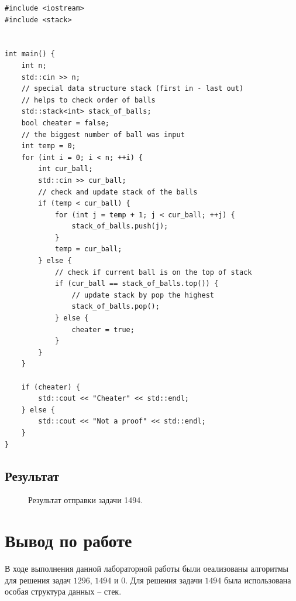 \documentclass[a5paper, 10pt]{article}
\theoremstyle{definition}
\theoremstyle{plain}
\theoremstyle{remark}
\begin{document}
\begin{center}
\begin{lstlisting}[label=some-code,caption={Исходный код для 1494}]
#include <iostream>
#include <stack>


int main() {
    int n;
    std::cin >> n;
    // special data structure stack (first in - last out)
    // helps to check order of balls
    std::stack<int> stack_of_balls;
    bool cheater = false;
    // the biggest number of ball was input
    int temp = 0;
    for (int i = 0; i < n; ++i) {
        int cur_ball;
        std::cin >> cur_ball;
        // check and update stack of the balls
        if (temp < cur_ball) {
            for (int j = temp + 1; j < cur_ball; ++j) {
                stack_of_balls.push(j);
            }
            temp = cur_ball;
        } else {
            // check if current ball is on the top of stack
            if (cur_ball == stack_of_balls.top()) {
                // update stack by pop the highest
                stack_of_balls.pop();
            } else {
                cheater = true;
            }
        }
    }

    if (cheater) {
        std::cout << "Cheater" << std::endl;
    } else {
        std::cout << "Not a proof" << std::endl;
    }
}
\end{lstlisting}
\end{center}

\subsection{Результат}
\begin{figure}[h]
\caption{Результат отправки задачи 1494.}
\end{figure}




\newpage
\section{Вывод по работе}
В ходе выполнения данной лабораторной работы были оеализованы алгоритмы для решения задач $1296$, $1494$ и $0$. Для решения задачи $1494$ была использована особая структура данных -- стек.
\end{document}
